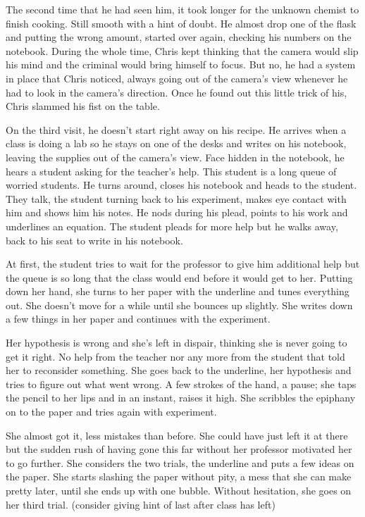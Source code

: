         The second time that he had seen him, it took longer for the unknown chemist to finish cooking. Still smooth with a hint of doubt. He
    almost drop one of the flask and putting the wrong amount, started over again, checking his numbers on the notebook. During the whole time,
    Chris kept thinking that the camera would slip his mind and the criminal would bring himself to focus. But no, he had a system in place that
    Chris noticed, always going out of the camera's view whenever he had to look in the camera's direction. Once he found out this little trick
    of his, Chris slammed his fist on the table.

        On the third visit, he doesn't start right away on his recipe. He arrives when a class is doing a lab so he stays on one of the desks
    and writes on his notebook, leaving the supplies out of the camera's view. Face hidden in the notebook, he hears a student asking for the
    teacher's help. This student is a long queue of worried students. He turns around, closes his notebook and heads to the student. They talk,
    the student turning back to his experiment, makes eye contact with him and shows him his notes. He nods during his plead, points to his
    work and underlines an equation. The student pleads for more help but he walks away, back to his seat to write in his notebook.

        At first, the student tries to wait for the professor to give him additional help but the queue is so long that the class would end 
    before it would get to her. Putting down her hand, she turns to her paper with the underline and tunes everything out. She doesn't move
    for a while until she bounces up slightly. She writes down a few things in her paper and continues with the experiment.

        Her hypothesis is wrong and she's left in dispair, thinking she is never going to get it right. No help from the teacher nor any more
    from the student that told her to reconsider something. She goes back to the underline, her hypothesis and tries to figure out what went
    wrong. A few strokes of the hand, a pause; she taps the pencil to her lips and in an instant, raises it high. She scribbles the epiphany on
    to the paper and tries again with experiment.

        She almost got it, less mistakes than before. She could have just left it at there but the sudden rush of having gone this far without
    her professor motivated her to go further. She considers the two trials, the underline and puts a few ideas on the paper. She starts slashing
    the paper without pity, a mess that she can make pretty later, until she ends up with one bubble. Without hesitation, she goes on her third
    trial. (consider giving hint of last after class has left)

